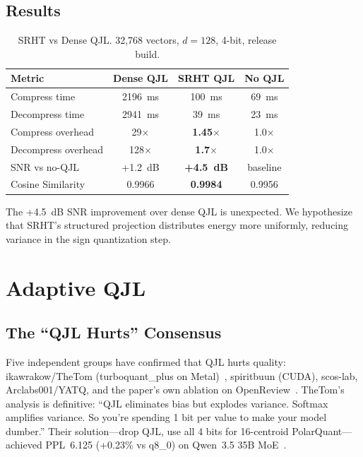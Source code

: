 \documentclass[11pt]{article}
\begin{document}
\subsection{Results}

\begin{table}[h]
\centering
\caption{SRHT vs Dense QJL. 32,768 vectors, $d{=}128$, 4-bit, release build.}
\label{tab:srht}
\begin{tabular}{@{}lccc@{}}
\toprule
Metric & Dense QJL & SRHT QJL & No QJL \\
\midrule
Compress time & 2196~ms & 100~ms & 69~ms \\
Decompress time & 2941~ms & 39~ms & 23~ms \\
Compress overhead & 29$\times$ & \textbf{1.45$\times$} & 1.0$\times$ \\
Decompress overhead & 128$\times$ & \textbf{1.7$\times$} & 1.0$\times$ \\
SNR vs no-QJL & +1.2~dB & \textbf{+4.5~dB} & baseline \\
Cosine Similarity & 0.9966 & \textbf{0.9984} & 0.9956 \\
\bottomrule
\end{tabular}
\end{table}

The +4.5~dB SNR improvement over dense QJL is unexpected. We hypothesize that SRHT's structured projection distributes energy more uniformly, reducing variance in the sign quantization step.

\section{Adaptive QJL}
\label{sec:adaptive}

\subsection{The ``QJL Hurts'' Consensus}

Five independent groups have confirmed that QJL hurts quality: ikawrakow/TheTom (turboquant\_plus on Metal)~\citep{theTom2026turbo4}, spiritbuun (CUDA), scos-lab, Arclabs001/YATQ, and the paper's own ablation on OpenReview~\citep{llamacpp_tq}. TheTom's analysis is definitive: ``QJL eliminates bias but explodes variance. Softmax amplifies variance. So you're spending 1 bit per value to make your model dumber.'' Their solution---drop QJL, use all 4 bits for 16-centroid PolarQuant---achieved PPL~6.125 (+0.23\% vs q8\_0) on Qwen~3.5 35B MoE~\citep{theTom2026turbo4}.
\end{document}

